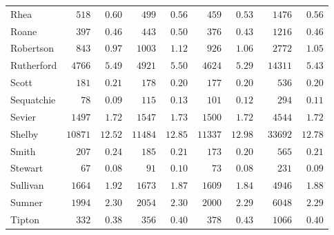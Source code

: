 \documentclass[9pt, oneside]{article}   	%
\begin{document}
\begin{longtable}{lcccccccc}
Rhea  & $\phantom{00}518$ & $\phantom{0}0.60$ & $\phantom{00}499$ & $\phantom{0}0.56$ & $\phantom{00}459$ & $\phantom{0}0.53$ & $\phantom{00}1476$ & $\phantom{0}0.56$ \\
Roane  & $\phantom{00}397$ & $\phantom{0}0.46$ & $\phantom{00}443$ & $\phantom{0}0.50$ & $\phantom{00}376$ & $\phantom{0}0.43$ & $\phantom{00}1216$ & $\phantom{0}0.46$ \\
Robertson  & $\phantom{00}843$ & $\phantom{0}0.97$ & $\phantom{0}1003$ & $\phantom{0}1.12$ & $\phantom{00}926$ & $\phantom{0}1.06$ & $\phantom{00}2772$ & $\phantom{0}1.05$ \\
Rutherford  & $\phantom{0}4766$ & $\phantom{0}5.49$ & $\phantom{0}4921$ & $\phantom{0}5.50$ & $\phantom{0}4624$ & $\phantom{0}5.29$ & $\phantom{0}14311$ & $\phantom{0}5.43$ \\
Scott  & $\phantom{00}181$ & $\phantom{0}0.21$ & $\phantom{00}178$ & $\phantom{0}0.20$ & $\phantom{00}177$ & $\phantom{0}0.20$ & $\phantom{000}536$ & $\phantom{0}0.20$ \\
Sequatchie  & $\phantom{000}78$ & $\phantom{0}0.09$ & $\phantom{00}115$ & $\phantom{0}0.13$ & $\phantom{00}101$ & $\phantom{0}0.12$ & $\phantom{000}294$ & $\phantom{0}0.11$ \\
Sevier  & $\phantom{0}1497$ & $\phantom{0}1.72$ & $\phantom{0}1547$ & $\phantom{0}1.73$ & $\phantom{0}1500$ & $\phantom{0}1.72$ & $\phantom{00}4544$ & $\phantom{0}1.72$ \\
Shelby  & $10871$ & $12.52$ & $11484$ & $12.85$ & $11337$ & $12.98$ & $\phantom{0}33692$ & $12.78$ \\
Smith  & $\phantom{00}207$ & $\phantom{0}0.24$ & $\phantom{00}185$ & $\phantom{0}0.21$ & $\phantom{00}173$ & $\phantom{0}0.20$ & $\phantom{000}565$ & $\phantom{0}0.21$ \\
Stewart  & $\phantom{000}67$ & $\phantom{0}0.08$ & $\phantom{000}91$ & $\phantom{0}0.10$ & $\phantom{000}73$ & $\phantom{0}0.08$ & $\phantom{000}231$ & $\phantom{0}0.09$ \\
Sullivan  & $\phantom{0}1664$ & $\phantom{0}1.92$ & $\phantom{0}1673$ & $\phantom{0}1.87$ & $\phantom{0}1609$ & $\phantom{0}1.84$ & $\phantom{00}4946$ & $\phantom{0}1.88$ \\
Sumner  & $\phantom{0}1994$ & $\phantom{0}2.30$ & $\phantom{0}2054$ & $\phantom{0}2.30$ & $\phantom{0}2000$ & $\phantom{0}2.29$ & $\phantom{00}6048$ & $\phantom{0}2.29$ \\
Tipton  & $\phantom{00}332$ & $\phantom{0}0.38$ & $\phantom{00}356$ & $\phantom{0}0.40$ & $\phantom{00}378$ & $\phantom{0}0.43$ & $\phantom{00}1066$ & $\phantom{0}0.40$ \\

\end{longtable}
\end{document}
